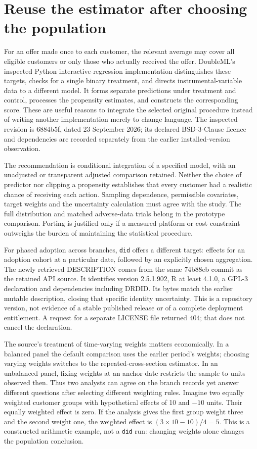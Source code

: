 \section{Reuse the estimator after choosing the population}
For an offer made once to each customer, the relevant average may cover all
eligible customers or only those who actually received the offer. DoubleML's
inspected Python interactive-regression implementation distinguishes these
targets, checks for a single binary treatment, and directs instrumental-variable
data to a different model. It forms separate predictions under treatment and
control, processes the propensity estimates, and constructs the corresponding
score. These are useful reasons to integrate the selected original procedure
instead of writing another implementation merely to change language.
The inspected revision is 6884b5f, dated 23 September 2026; its declared
BSD-3-Clause licence and dependencies are recorded separately from the earlier
installed-version observation. \citep{exec23_doubleml_reuse_source}

The recommendation is conditional integration of a specified model, with an
unadjusted or transparent adjusted comparison retained. Neither the choice of
predictor nor clipping a propensity establishes that every customer had a
realistic chance of receiving each action. Sampling dependence, permissible
covariates, target weights and the uncertainty calculation must agree with the
study. The full distribution and matched adverse-data trials belong in the
prototype comparison. Porting is justified only if a measured platform or
cost constraint outweighs the burden of maintaining the statistical procedure.

For phased adoption across branches, \texttt{did} offers a different target:
effects for an adoption cohort at a particular date, followed by an explicitly
chosen aggregation. The newly retrieved DESCRIPTION comes from the same
74b88eb commit as the retained API source. It identifies version 2.5.1.902,
R at least 4.1.0, a GPL-3 declaration and dependencies including DRDID.
Its bytes match the earlier mutable description, closing that specific
identity uncertainty. This is a repository version, not evidence of a stable
published release or of a complete deployment entitlement. A request for a
separate LICENSE file returned 404; that does not cancel the declaration.
\citep{survey29did,exec24_panelr_did}

The source's treatment of time-varying weights matters economically. In a
balanced panel the default comparison uses the earlier period's weights;
choosing varying weights switches to the repeated-cross-section estimator.
In an unbalanced panel, fixing weights at an anchor date restricts the sample
to units observed then. Thus two analysts can agree on the branch records yet
answer different questions after selecting different weighting rules. Imagine
two equally weighted customer groups with hypothetical effects of 10 and
$-10$ units. Their equally weighted effect is zero. If the analysis gives
the first group weight three and the second weight one, the weighted effect
is $(3\times10-10)/4=5$. This is a constructed arithmetic example, not a
\texttt{did} run: changing weights alone changes the population conclusion.
\citep{survey29didapi}

